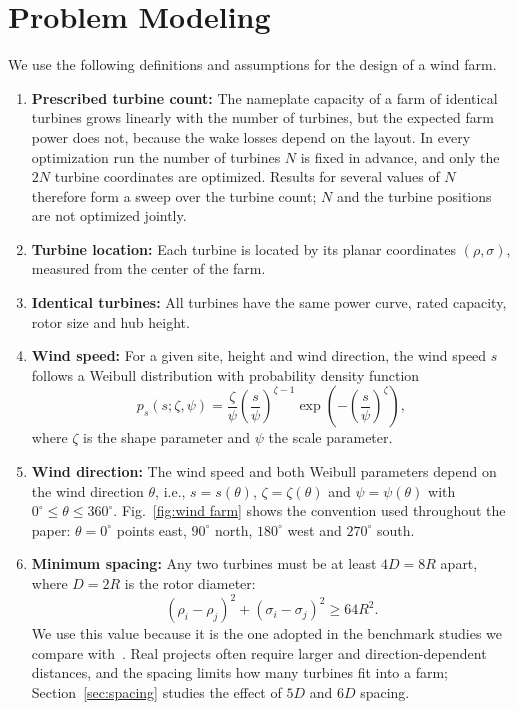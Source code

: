 \documentclass[journal,twoside]{IEEEtran}
\begin{document}
\section{Problem Modeling}
\label{sec:model}

We use the following definitions and assumptions for the design of a wind farm.

\begin{enumerate}
    \item \textbf{Prescribed turbine count:} The nameplate capacity of a farm of identical turbines grows linearly with the number of turbines, but the expected farm power does not, because the wake losses depend on the layout. In every optimization run the number of turbines $N$ is fixed in advance, and only the $2N$ turbine coordinates are optimized. Results for several values of $N$ therefore form a sweep over the turbine count; $N$ and the turbine positions are not optimized jointly.

    \item \textbf{Turbine location:} Each turbine is located by its planar coordinates $(\rho,\sigma)$, measured from the center of the farm.

    \item \textbf{Identical turbines:} All turbines have the same power curve, rated capacity, rotor size and hub height.

    \item \textbf{Wind speed:} For a given site, height and wind direction, the wind speed $s$ follows a Weibull distribution with probability density function
    \[
        p_s (s;\zeta,\psi) = \frac{\zeta}{\psi} \left( \frac{s}{\psi} \right)^{\zeta-1} \exp\left(-\left( \frac{s}{\psi} \right)^\zeta \right),
    \]
    where $\zeta$ is the shape parameter and $\psi$ the scale parameter.

    \item \textbf{Wind direction:} The wind speed and both Weibull parameters depend on the wind direction $\theta$, i.e., $s = s(\theta)$, $\zeta = \zeta(\theta)$ and $\psi = \psi(\theta)$ with $0^\circ \leq \theta \leq 360^\circ$. Fig.~\ref{fig:wind farm} shows the convention used throughout the paper: $\theta=0^\circ$ points east, $90^\circ$ north, $180^\circ$ west and $270^\circ$ south.

    \item \textbf{Minimum spacing:} Any two turbines must be at least $4D=8R$ apart, where $D=2R$ is the rotor diameter:
    \[
        (\rho_i - \rho_j)^2 + (\sigma_i - \sigma_j)^2 \geq 64R^2 .
    \]
    We use this value because it is the one adopted in the benchmark studies we compare with~\cite{Kusiak2010,Bansal2017}. Real projects often require larger and direction-dependent distances, and the spacing limits how many turbines fit into a farm; Section~\ref{sec:spacing} studies the effect of $5D$ and $6D$ spacing.


\end{enumerate}
\end{document}
